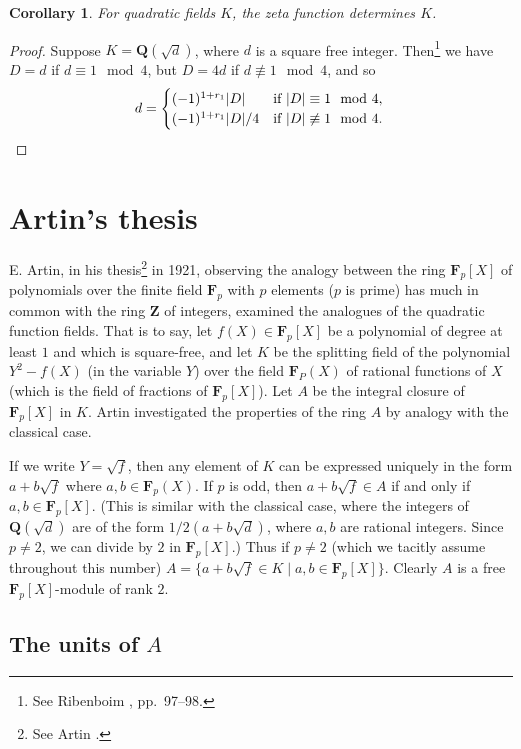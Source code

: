 \documentclass[10pt,leqno]{article}
\newtheorem{coro}[theo]{Corollary}
\theoremstyle{definition}
\def\ZZ{\mathbf{Z}}
\def\QQ{\mathbf{Q}}
\def\FF{\mathbf{F}}
\def\fntwze{See Ribenboim \cite{bib:154}, pp.~97--98.}
\def\fntwon{See Artin \cite{bib:6}.}
\begin{document}
\begin{coro}
\label{2.4.4}
For quadratic fields $K$, the zeta function determines $K$.
\end{coro}

\begin{proof}
Suppose $K = \QQ(\sqrt d)$, where $d$ is a square free integer.
Then\footnote{\fntwze} we have $D = d$ if $d \equiv 1 \mod 4$, but $D = 4d$ if $d \not\equiv 1 \mod 4$, and so
\[
d = \begin{cases}
(-1)^{1+r_1} |D| & \text{if $|D| \equiv 1 \mod 4$},
\\
(-1)^{1+r_1} |D|/4 & \text{if $|D| \not\equiv 1 \mod 4$}.
\end{cases}
\qedhere
\]
\end{proof}





\section{Artin's thesis}
\label{ch:3}

E. Artin, in his thesis\footnote{\fntwon} in 1921, observing the analogy between the ring $\FF_p[X]$ of polynomials over the finite field $\FF_p$ with $p$ elements ($p$ is prime) has much in common with the ring $\ZZ$ of integers, examined the analogues of the quadratic function fields.
That is to say, let $f(X) \in \FF_p[X]$ be a polynomial of degree at least $1$ and which is square-free, and let $K$ be the splitting field of the polynomial $Y^2 - f(X)$ (in the variable $Y$) over the field $\FF_P(X)$ of rational functions of $X$ (which is the field of fractions of $\FF_p[X]$).
Let $A$ be the integral closure of $\FF_p[X]$ in $K$.
Artin investigated the properties of the ring $A$ by analogy with the classical case.

If we write $Y = \sqrt f$, then any element of $K$ can be expressed uniquely in the form $a + b \sqrt f$ where $a,b \in \FF_p(X)$.
If $p$ is odd, then $a + b \sqrt f \in A$ if and only if $a,b \in \FF_p[X]$.
(This is similar with the classical case, where the integers of $\QQ(\sqrt d)$ are of the form $1/2(a + b\sqrt d)$, where $a,b$ are rational integers.
Since $p\not=2$, we can divide by $2$ in $\FF_p[X]$.)
Thus if $p \not= 2$ (which we tacitly assume throughout this number) $A = \{a + b \sqrt f \in K \mid a, b \in \FF_p[X]\}$.
Clearly $A$ is a free $\FF_p[X]$-module of rank $2$.


\subsection[The units of A]{The units of $A$}
\label{ch:3.1}
\end{document}
